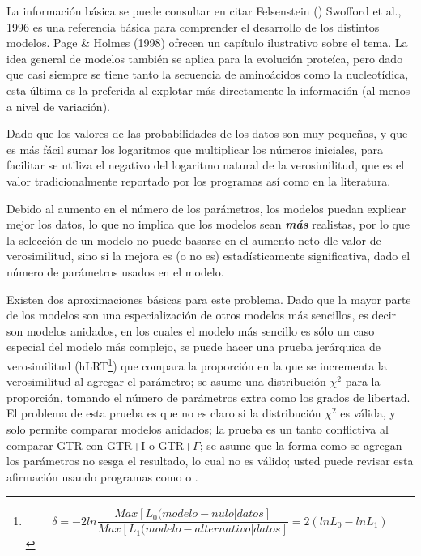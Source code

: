 La informaci\'on b\'asica se puede consultar en citar Felsenstein () %
Swofford et al., 1996 \cite{Swofford1996} es una referencia b\'asica para comprender el desarrollo de los distintos modelos. Page \& Holmes (1998) ofrecen un cap\'itulo ilustrativo sobre el tema. La idea general de modelos tambi\'en se aplica para la evoluci\'on prote\'ica, pero dado que casi siempre se tiene tanto la secuencia de amino\'acidos como la nucleot\'idica, esta \'ultima es la preferida al explotar m\'as directamente la informaci\'on (al menos a nivel de variaci\'on).

Dado que los valores de las probabilidades de los datos son muy peque\~nas, y que es m\'as f\'acil sumar los logaritmos que multiplicar los n\'umeros iniciales, para facilitar se utiliza el negativo del logaritmo natural de la verosimilitud, que es el valor tradicionalmente reportado por los programas as\'i como en la literatura.

Debido al aumento en el n\'umero de los par\'ametros, los modelos puedan explicar mejor los datos, lo que no implica que los modelos sean \emph{\textbf{m\'as}} realistas, por lo que la selecci\'on de un modelo no puede basarse en el aumento neto dle valor de verosimilitud, sino si la mejora es (o no es) estad\'isticamente significativa, dado el n\'umero de par\'ametros usados en el modelo.

Existen dos aproximaciones b\'asicas para este problema. Dado que la mayor parte de los modelos son una especializaci\'on de otros modelos m\'as sencillos, es decir son modelos anidados, en los cuales el modelo m\'as sencillo es s\'olo un caso especial del modelo m\'as complejo, se puede hacer una prueba jer\'arquica de verosimilitud (hLRT\footnote
{\begin{equation}
\delta = -2 ln \frac{Max[L_{0}(modelo-nulo|datos]}{Max[L_{1}(modelo-alternativo|datos]} = 2 (ln L_{0} - ln L_{1}) 
\end{equation}
}) que compara la proporci\'on en la que se incrementa la verosimilitud al agregar el par\'ametro; se asume una distribuci\'on $\chi^2$  para la proporci\'on, tomando el n\'umero de par\'ametros extra como los grados de libertad. El problema de esta prueba es que no es claro si la distribuci\'on $\chi^2$ es v\'alida, y solo permite comparar modelos anidados; la prueba es un tanto conflictiva al comparar GTR con GTR+I o GTR+$\Gamma$; se asume que la forma como se agregan los par\'ametros no sesga el resultado, lo cual no es v\'alido; usted puede revisar esta afirmaci\'on usando programas como  o .

